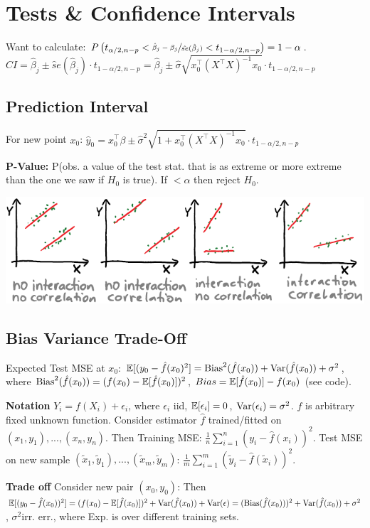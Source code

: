 \section*{Tests \& Confidence Intervals}
Want to calculate: $P\left( t_{\alpha / 2, n-p} < \sfrac{\hat \beta_j - \beta_j} {\hat {se}(\hat \beta_j)} < t_{1-\alpha / 2, n-p} \right) = 1 - \alpha$.
$CI = \hat \beta_j \pm \hat se(\hat \beta_j) \cdot t_{1- \alpha / 2, n-p} = \hat \beta_j \pm \hat \sigma \sqrt{x_0^\top (X^\top X)^{-1} x_0} \cdot t_{1- \alpha / 2, n-p}$
\subsection*{Prediction Interval}
For new point $x_0$:
$\hat y_0 = x_0^\top \beta \pm \hat \sigma^2 \sqrt{1 + x_0^\top (X^\top X)^{-1}x_0} \cdot t_{1-\alpha / 2, n-p}$

\textbf{P-Value:} P(obs. a value of the test stat. that is as extreme or more extreme than the one we saw if $H_0$ is true).
If $< \alpha$ then reject $H_0$.

\includegraphics[width=0.7\linewidth]{img/interaction.PNG}

\subsection*{Bias Variance Trade-Off}
Expected Test MSE at $x_0$: $\mathbb{E}[(y_0 - \hat f(x_0)^2] = \text{Bias}^2 (\hat f(x_0)) + \text{Var}(\hat f(x_0)) + \sigma^2$, where $\text{Bias}^2(\hat f(x_0)) = (f(x_0)-\mathbb{E}[\hat f(x_0)])^2$, $Bias = \mathbb{E}[\hat f(x_0)] - f(x_0)$ (see code).

\textbf{Notation}
$Y_i=f(X_i)+\epsilon_i$, where $\epsilon_i$ iid, $\mathbb{E}[\epsilon_i]=0$, $\textup{Var}(\epsilon_i)=\sigma^2$. $f$ is arbitrary fixed unknown function. Consider estimator $\hat f$ trained/fitted on $(x_1,y_1),...,(x_n,y_n)$. Then Training MSE: $\tfrac{1}{n} \sum_{i=1}^n (y_i-\hat f(x_i))^2$. Test MSE on new sample $(\tilde x_1, \tilde y_1),...,(\tilde x_m, \tilde y_m)$: $\tfrac{1}{m}\sum_{i=1}^m (\tilde y_i-\hat f(\tilde x_i))^2$.

\textbf{Trade off}
Consider new pair $(x_0,y_0)$: Then $\mathbb{E}[(y_0-\hat f(x_0))^2]=(f(x_0)-\mathbb{E}[\hat f(x_0)])^2+\textup{Var}(\hat f(x_0))+\textup{Var}(\epsilon)=(\textup{Bias}(\hat f(x_0)))^2+\textup{Var}(\hat f(x_0))+{\sigma^2}$, $\sigma^2$irr. err., where Exp. is over different training sets.


